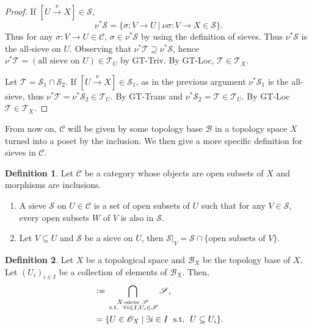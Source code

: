 \documentclass[10pt]{article}
\numberwithin{equation}{section}
\theoremstyle{definition}
\newtheorem{definition}{Definition}[subsection]
\DeclareMathOperator{\straw}{s.t.}
\newcommand{\defeq}{\vcentcolon=}
\newcommand{\sep}[0]{\:|\:}
\newcommand{\st}[0]{\:\straw\:}
\newcommand{\sC}[0]{\mathscr{C}}
\newcommand{\sS}[0]{\mathscr{S}}
\newcommand{\cB}[0]{\mathcal{B}}
\begin{document}
\begin{proof}
    If $[U\stackrel{\nu}{\to}X]\in\sS$,
    \begin{equation*}
    \nu^*\sS = \{\sigma:V\to U\sep \nu\sigma: V\to X\in\sS\}.
    \end{equation*}
    Thus for any $\sigma:V\to U\in\sC$, $\sigma\in\nu^*\sS$ by using the definition of sieves. Thus $\nu^*\sS$ is the all-sieve on $U$. Observing that $\nu^*\mathscr{T}\supseteq \nu^*\sS$, hence $\nu^*\mathscr{T}=(\text{all sieve on $U$})\in\mathcal{T}_U$ by GT-Triv.
    By GT-Loc, $\mathscr{T}\in\mathcal{T}_X$.
    \par Let $\mathscr{T}=\sS_1\cap \sS_2$. If $[U\stackrel{\nu}{\to}X]\in\sS_1$, as in the previous argument $\nu^*\mathscr{S}_1$ is the all-sieve, thus $\nu^*\mathscr{T}=\nu^*\sS_2\in\mathcal{T}_U$. By GT-Trans and $\nu^*\sS_2=\mathscr{T}\in\mathcal{T}_U$. By GT-Loc $\mathscr{T}\in\mathcal{T}_X$.
\end{proof}
From now on, $\sC$ will be given by some topology base $\mathcal{B}$ in a topology space $X$ turned into a poset by the inclusion. We then give a more specific definition for sieves in $\sC$.
\begin{definition}
    Let $\sC$ be a category whose objects are open subsets of $X$ and morphisms are inclusions.
    \begin{enumerate}[1.]
        \item A sieve $\sS$ on $U\in\sC$ is a set of open subsets of $U$ such that for any $V\in\sS$, every open subsets $W$ of $V$ is also in $\sS$.
        \item Let $V\subseteq U$ and $\sS$ be a sieve on $U$, then $\sS|_V = \sS\cap\{\text{open subsets of $V$}\}$.
    \end{enumerate}
\end{definition}
\begin{definition}
    \label{definition_8_3}
    Let $X$ be a topological space and $\cB_X$ be the topology base of $X$. Let $(U_i)_{i\in I}$ be a collection of elements of $\cB_X$. Then,
    \begin{align*}
        [U_i|i\in I]&\defeq \bigcap_{\substack{\text{$X$-sieve $\mathscr{S}$}\\ \st\:\forall i\in I,U_i\in\sS}}\sS,\\
        & =\{U\in\mathscr{O}_X\sep \exists i\in I\:\st\: U\subseteq U_i\}.
    \end{align*}
\end{definition}
\end{document}
